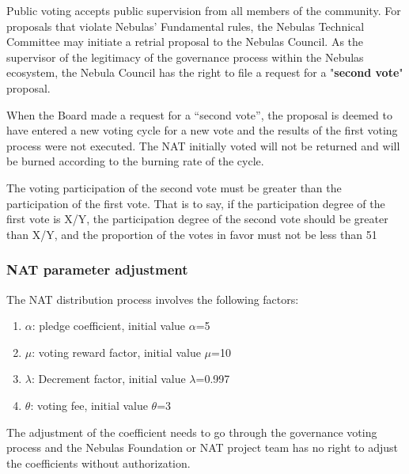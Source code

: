 Public voting accepts public supervision from all members of the community. For proposals that violate Nebulas' Fundamental rules, the Nebulas Technical Committee may initiate a retrial proposal to the Nebulas Council. As the supervisor of the legitimacy of the governance process within the Nebulas ecosystem, the Nebula Council has the right to file a request for a "\textbf{second vote}" proposal.

When the Board made a request for a “second vote”, the proposal is deemed to have entered a new voting cycle for a new vote and the results of the first voting process were not executed. The NAT initially voted will not be returned and will be burned according to the burning rate of the cycle.

The voting participation of the second vote must be greater than the participation of the first vote. That is to say, if the participation degree of the first vote is X/Y, the participation degree of the second vote should be greater than X/Y, and the proportion of the votes in favor must not be less than 51%

\subsubsection{NAT parameter adjustment}

The NAT distribution process involves the following factors:

\begin{enumerate}
	\item $\alpha$: pledge coefficient, initial value $\alpha$=5
	\item $\mu$: voting reward factor, initial value $\mu$=10
	\item $\lambda$: Decrement factor, initial value $\lambda$=0.997
	\item $\theta$: voting fee, initial value $\theta$=3
\end{enumerate}

The adjustment of the coefficient needs to go through the governance voting process and the Nebulas Foundation or NAT project team has no right to adjust the coefficients without authorization.
